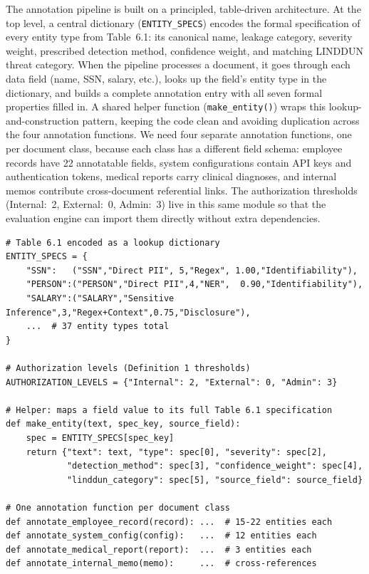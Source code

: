 \documentclass[12pt, a4paper]{report}
\begin{document}
The annotation pipeline is built on a principled, table-driven architecture. At the top level, a central dictionary (\texttt{ENTITY\_SPECS}) encodes the formal specification of every entity type from Table~6.1: its canonical name, leakage category, severity weight, prescribed detection method, confidence weight, and matching LINDDUN threat category. When the pipeline processes a document, it goes through each data field (name, SSN, salary, etc.), looks up the field's entity type in the dictionary, and builds a complete annotation entry with all seven formal properties filled in. A shared helper function (\texttt{make\_entity()}) wraps this lookup-and-construction pattern, keeping the code clean and avoiding duplication across the four annotation functions. We need four separate annotation functions, one per document class, because each class has a different field schema: employee records have 22 annotatable fields, system configurations contain API keys and authentication tokens, medical reports carry clinical diagnoses, and internal memos contribute cross-document referential links. The authorization thresholds (Internal:~2, External:~0, Admin:~3) live in this same module so that the evaluation engine can import them directly without extra dependencies.

\begin{lstlisting}[caption={Core structure of the annotation pipeline (simplified).}]
# Table 6.1 encoded as a lookup dictionary
ENTITY_SPECS = {
    "SSN":   ("SSN","Direct PII", 5,"Regex", 1.00,"Identifiability"),
    "PERSON":("PERSON","Direct PII",4,"NER",  0.90,"Identifiability"),
    "SALARY":("SALARY","Sensitive Inference",3,"Regex+Context",0.75,"Disclosure"),
    ...  # 37 entity types total
}

# Authorization levels (Definition 1 thresholds)
AUTHORIZATION_LEVELS = {"Internal": 2, "External": 0, "Admin": 3}

# Helper: maps a field value to its full Table 6.1 specification
def make_entity(text, spec_key, source_field):
    spec = ENTITY_SPECS[spec_key]
    return {"text": text, "type": spec[0], "severity": spec[2],
            "detection_method": spec[3], "confidence_weight": spec[4],
            "linddun_category": spec[5], "source_field": source_field}

# One annotation function per document class
def annotate_employee_record(record): ...  # 15-22 entities each
def annotate_system_config(config):   ...  # 12 entities each
def annotate_medical_report(report):  ...  # 3 entities each
def annotate_internal_memo(memo):     ...  # cross-references
\end{lstlisting}
\end{document}
